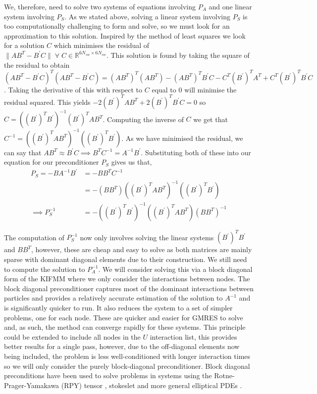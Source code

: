 We, therefore, need to solve two systems of equations involving $P_A$ and one linear system involving $P_S$. As we stated above, solving a linear system involving $P_S$ is too computationally challenging to form and solve, so we must look for an approximation to this solution. Inspired by the method of least squares we look for a solution $C$ which minimises the residual of $\lVert AB^T - B^\prime C \rVert \;\forall\; C \in \mathbb{R}^{6N_{sw}\times6N_{sw}}$. This solution is found by taking the square of the residual to obtain $(AB^T - B^\prime C)^T(AB^T - B^\prime C) = (AB^T)^T(AB^T)-(AB^T)^TB^\prime C-C^T(B^\prime)^TA^T + C^T(B^\prime)^TB^\prime C$. Taking the derivative of this with respect to $C$ equal to $0$ will minimise the residual squared. This yields $-2(B^\prime)^TAB^T + 2(B^\prime)^TB^\prime C=0$ so $C = ((B^\prime)^TB^\prime)^{-1}(B^\prime)^TAB^T$. Computing the inverse of $C$ we get that $C^{-1} = ((B^\prime)^TAB^T)^{-1}((B^\prime)^TB^\prime)$. As we have minimised the residual, we can say that $AB^T \approx B^\prime C \implies B^T C^{-1} = A^{-1}B^\prime$. Substituting both of these into our equation for our preconditioner $P_S$ gives us that, 
\begin{equation}
\begin{aligned}
    P_S = - B A^{-1}B^\prime &= -B B^{T} C^{-1} \\
    & = -(B B^{T})((B^\prime)^TAB^T)^{-1}((B^\prime)^TB^\prime) \\
    \implies P_S^{-1} &= -((B^\prime)^TB^\prime)^{-1}((B^\prime)^TAB^T)(B B^{T})^{-1}
\end{aligned}
\label{eq:PreconS}
\end{equation}

The computation of $P_S^{-1}$ now only involves solving the linear systems $(B^\prime)^TB^\prime$ and $B B^{T}$, however, these are cheap and easy to solve as both matrices are mainly sparse with dominant diagonal elements due to their construction. We still need to compute the solution to $P_A^{-1}$. We will consider solving this via a block diagonal form of the KIFMM where we only consider the interactions between nodes. 
The block diagonal preconditioner captures most of the dominant interactions between particles and provides a relatively accurate estimation of the solution to $A^{-1}$ and is significantly quicker to run. It also reduces the system to a set of simpler problems, one for each node. These are quicker and easier for GMRES to solve and, as such, the method can converge rapidly for these systems. This principle could be extended to include all nodes in the $U$ interaction list, this provides better results for a single pass, however, due to the off-diagonal elements now being included, the problem is less well-conditioned with longer interaction times so we will only consider the purely block-diagonal preconditioner. Block diagonal preconditions have been used to solve problems in systems using the Rotne-Prager-Yamakawa (RPY) tensor \cite{UsabiagaHYDRODYNAMICSAPPROACH}, stokeslet\cite{Nazockdast2017AMechanics} and more general elliptical PDEs \cite{Ibeid2018FastEquations}. 


